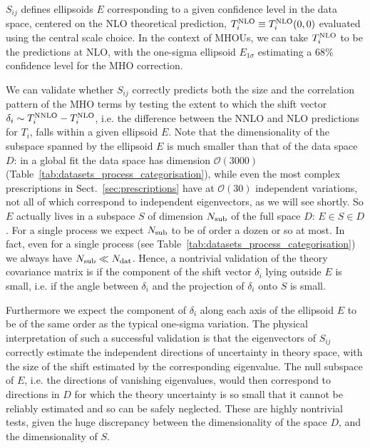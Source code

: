 $S_{ij}$ defines ellipsoids $E$ corresponding to a given confidence level 
in the data space, centered on the NLO theoretical 
prediction, $T^{\rm NLO}_i\equiv T^{\rm NLO}_i(0,0)$ evaluated using the central scale
choice.
%
In the context of MHOUs, we can take $T^{\rm NLO}_i$ to be the predictions
at NLO, with the one-sigma ellipsoid $E_{1\sigma}$
estimating a 68\% confidence level for the MHO correction.

We can validate whether $S_{ij}$
correctly predicts both the size and the correlation pattern of the
MHO terms by testing the extent to which the shift vector $\delta_i \sim T^{\rm NNLO}_i-T^{\rm NLO}_i$, i.e. the difference between the NNLO and NLO predictions 
for $T_i$, falls within a given ellipsoid $E$.
Note that the dimensionality of the subspace spanned by
the ellipsoid $E$ is much smaller than that of the data space $D$: in a 
global fit the data space has dimension
$\mathcal{O}(3000)$ (Table~\ref{tab:datasets_process_categorisation}), while 
even the most complex prescriptions in
Sect.~\ref{sec:prescriptions} have at $\mathcal{O}(30)$ independent
variations, not all of which correspond to independent eigenvectors, as
we will see shortly. So 
$E$ actually lives in a subspace $S$ of dimension $N_{\rm sub}$ of
the full space  $D$: $E \in S \in D$. For a single process we expect
$N_{\rm sub}$ to be of order a dozen or so at most. 
In fact, even for a single process
(see Table~\ref{tab:datasets_process_categorisation}) we always 
have $N_{\rm sub} \ll N_{\rm dat}$.
Hence, a nontrivial validation of the theory covariance matrix is if the component of the shift vector $\delta_i$ lying outside $E$ is small, i.e. if the angle
between $\delta_i$ and the projection of $\delta_i$ onto $S$ is small. 

Furthermore we expect the component of $\delta_i$ along each axis of the
ellipsoid $E$ to be of the same order as the typical one-sigma variation.
The physical interpretation of such a successful validation is that
the eigenvectors of $S_{ij}$ correctly estimate
the independent directions of uncertainty in theory space, with the
size of the shift estimated by the corresponding eigenvalue. The null
subspace of $E$, i.e. the directions of vanishing eigenvalues, would
then correspond to directions in $D$ for which the theory uncertainty
is so small that it cannot  be reliably estimated and so can be
safely neglected. These are highly nontrivial tests, given the huge 
discrepancy between the dimensionality of the space $D$, and the 
dimensionality of $S$.


